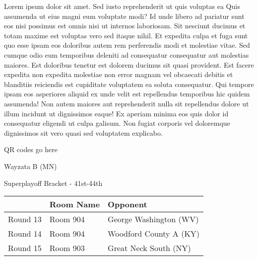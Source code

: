 \documentclass{article}%
\begin{document}
\vspace*{8pt}%
\linebreak%
\newline%
\newline%
Lorem ipsum dolor sit amet. Sed iusto reprehenderit ut quis voluptas ea Quis assumenda ut eius magni eum voluptate modi? Id unde libero ad pariatur sunt eos nisi possimus est omnis nisi ut internos laboriosam. Sit nesciunt ducimus et totam maxime est voluptas vero sed itaque nihil. Et expedita culpa et fuga sunt quo esse ipsam eos doloribus autem rem perferendis modi et molestiae vitae.\newline%
\newline%
Sed cumque odio eum temporibus deleniti ad consequatur consequatur aut molestias maiores. Est doloribus tenetur est dolorem ducimus sit quasi provident. Est facere expedita non expedita molestiae non error magnam vel obcaecati debitis et blanditiis reiciendis est cupiditate voluptatem ea soluta consequatur. Qui tempore ipsam eos asperiores aliquid ex unde velit est repellendus temporibus hic quidem assumenda!\newline%
\newline%
Non autem maiores aut reprehenderit nulla sit repellendus dolore ut illum incidunt ut dignissimos eaque! Ex aperiam minima eos quis dolor id consequatur eligendi ut culpa galisum. Non fugiat corporis vel doloremque dignissimos sit vero quasi sed voluptatem explicabo.\newline%
\newline%
%
\vspace*{30pt}%
\begin{center}%
\begin{Huge}%
QR codes go here%
\end{Huge}%
\end{center}%
\newpage%
\begin{center}%
\begin{Huge}%
Wayzata B (MN)%
\end{Huge}%
\vspace*{8pt}%
\linebreak%
\begin{Large}%
Superplayoff Bracket {-} 41st{-}44th%
\end{Large}%
\end{center}%
%
\begin{tabularx}{\textwidth}{|c|Y|Y|}%
\hline%
&Room Name&Opponent\\%
\hline%
Round 13&Room 904&George Washington (WV)\\%
Round 14&Room 904&Woodford County A (KY)\\%
Round 15&Room 903&Great Neck South (NY)\\%
\hline%
\end{tabularx}%
\end{document}
